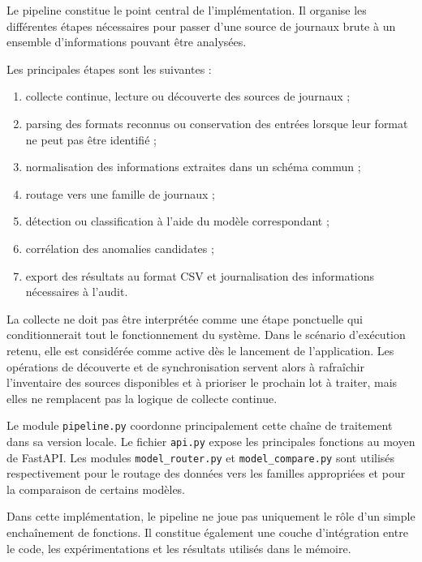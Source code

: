 Le pipeline constitue le point central de l'implémentation. Il organise les différentes étapes nécessaires pour passer d'une source de journaux brute à un ensemble d'informations pouvant être analysées.

Les principales étapes sont les suivantes :

\begin{enumerate}

\item collecte continue, lecture ou découverte des sources de journaux ;

\item parsing des formats reconnus ou conservation des entrées lorsque leur format ne peut pas être identifié ;

\item normalisation des informations extraites dans un schéma commun ;

\item routage vers une famille de journaux ;

\item détection ou classification à l'aide du modèle correspondant ;

\item corrélation des anomalies candidates ;

\item export des résultats au format CSV et journalisation des informations nécessaires à l'audit.

\end{enumerate}

La collecte ne doit pas être interprétée comme une étape ponctuelle qui conditionnerait tout le fonctionnement du système.
Dans le scénario d'exécution retenu, elle est considérée comme active dès le lancement de l'application.
Les opérations de découverte et de synchronisation servent alors à rafraîchir l'inventaire des sources disponibles et à prioriser le prochain lot à traiter, mais elles ne remplacent pas la logique de collecte continue.

Le module \texttt{pipeline.py} coordonne principalement cette chaîne de traitement dans sa version locale. Le fichier \texttt{api.py} expose les principales fonctions au moyen de FastAPI. Les modules \texttt{model\_router.py} et \texttt{model\_compare.py} sont utilisés respectivement pour le routage des données vers les familles appropriées et pour la comparaison de certains modèles.

Dans cette implémentation, le pipeline ne joue pas uniquement le rôle d'un simple enchaînement de fonctions. Il constitue également une couche d'intégration entre le code, les expérimentations et les résultats utilisés dans le mémoire.

